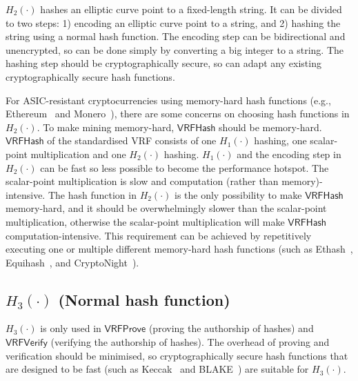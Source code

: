 
$H_{2}(\cdot)$ hashes an elliptic curve point to a fixed-length string.
It can be divided to two steps: 1) encoding an elliptic curve point to a string, and 2) hashing the string using a normal hash function.
The encoding step can be bidirectional and unencrypted, so can be done simply by converting a big integer to a string.
The hashing step should be cryptographically secure, so can adapt any existing cryptographically secure hash functions.

For ASIC-resistant cryptocurrencies using memory-hard hash functions (e.g., Ethereum~\cite{} and Monero~\cite{}), there are some concerns on choosing hash functions in $H_{2}(\cdot)$.
To make mining memory-hard, $\mathsf{VRFHash}$ should be memory-hard.
$\mathsf{VRFHash}$ of the standardised VRF consists of one $H_{1}(\cdot)$ hashing, one scalar-point multiplication and one $H_{2}(\cdot)$ hashing.
$H_{1}(\cdot)$ and the encoding step in $H_{2}(\cdot)$ can be fast so less possible to become the performance hotspot.
The scalar-point multiplication is slow and computation (rather than memory)-intensive.
The hash function in $H_{2}(\cdot)$ is the only possibility to make $\mathsf{VRFHash}$ memory-hard, and it should be overwhelmingly slower than the scalar-point multiplication, otherwise the scalar-point multiplication will make $\mathsf{VRFHash}$ computation-intensive.
This requirement can be achieved by repetitively executing one or multiple different memory-hard hash functions (such as Ethash~\cite{}, Equihash~\cite{}, and CryptoNight~\cite{}).





\subsection{$H_{3}(\cdot)$ (Normal hash function)}
$H_{3}(\cdot)$ is only used in $\mathsf{VRFProve}$ (proving the authorship of hashes) and $\mathsf{VRFVerify}$ (verifying the authorship of hashes).
The overhead of proving and verification should be minimised, so cryptographically secure hash functions that are designed to be fast (such as Keccak~\cite{} and BLAKE~\cite{}) are suitable for $H_{3}(\cdot)$.